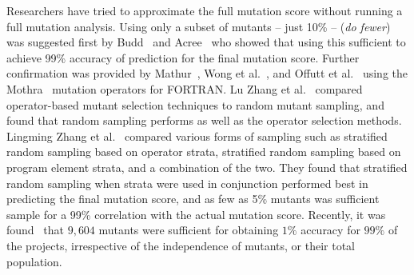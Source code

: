 \documentclass[conference]{IEEEtran}
\begin{document}
Researchers have tried to approximate the full mutation score without
running a full mutation analysis. Using only a subset of mutants -- just 10\% --
(\textit{do fewer}) was suggested first by Budd~\cite{budd1980mutation}
and Acree~\cite{acree1980mutation} who showed that using this sufficient to
achieve 99\% accuracy of prediction for the final mutation score.
Further confirmation was provided by Mathur~\cite{mathur1991performance},
Wong et al.~\cite{wong1993mutation,wong1995reducing}, and Offutt et
al.~\cite{offutt1993experimental} using the Mothra~\cite{demillo1988an} mutation
operators for FORTRAN.  Lu Zhang et al.~\cite{zhang2010isoperator} compared
operator-based mutant selection techniques to random mutant sampling,
and found that random sampling performs as well as the operator selection
methods.  Lingming Zhang et al.~\cite{zhang2013operator} compared various
forms of sampling such as stratified random sampling based on operator strata,
stratified random sampling based on program element strata, and a combination
of the two. They found that stratified random sampling when strata were
used in conjunction performed best in predicting the final mutation score,
and as few as 5\% mutants was sufficient sample for a 99\% correlation with the actual
mutation score. Recently, it was found~\cite{gopinath2015howhard} that $9,604$
mutants were sufficient for obtaining $1\%$ accuracy for $99\%$ of the projects,
irrespective of the independence of mutants, or their total population.
\end{document}
